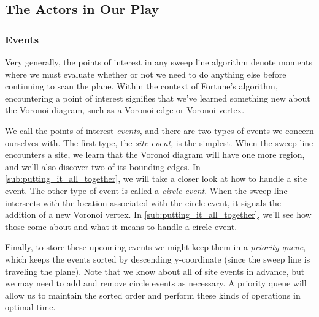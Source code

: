 \documentclass[12pt,twoside]{reedthesis}
\begin{document}
    \subsection{The Actors in Our Play} %
    \label{sub:the_actors_in_our_play}

      \subsubsection{Events} %
      \label{ssub:events}
        Very generally, the points of interest in any sweep line algorithm denote moments where we must evaluate whether or not we need to do anything else before continuing to scan the plane. Within the context of Fortune's algorithm, encountering a point of interest signifies that we've learned something new about the Voronoi diagram, such as a Voronoi edge or Voronoi vertex. \par

        We call the points of interest \emph{events}, and there are two types of events we concern ourselves with. The first type, the \emph{site event}, is the simplest. When the sweep line encounters a site, we learn that the Voronoi diagram will have one more region, and we'll also discover two of its bounding edges. In \cref{sub:putting_it_all_together}, we will take a closer look at how to handle a site event. The other type of event is called a \emph{circle event}. When the sweep line intersects with the location associated with the circle event, it signals the addition of a new Voronoi vertex. In \cref{sub:putting_it_all_together}, we'll see how those come about and what it means to handle a circle event.\par

        Finally, to store these upcoming events we might keep them in a \emph{priority queue}, which keeps the events sorted by descending y-coordinate (since the sweep line is traveling  the plane). Note that we know about all of site events in advance, but we may need to add and remove circle events as necessary. A priority queue will allow us to maintain the sorted order and perform these kinds of operations in optimal time. 


\end{document}
